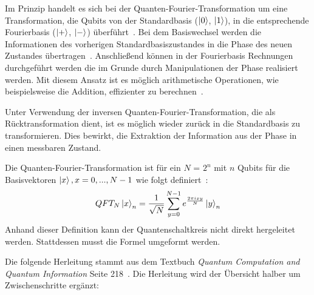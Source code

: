 Im Prinzip handelt es sich bei der Quanten-Fourier-Transformation um eine Transformation,
die Qubits von der Standardbasis (\(\ket{0}\), \(\ket{1}\)),
in die entsprechende Fourierbasis (\(\ket{+}\), \(\ket{-}\)) überführt~\cite{homeister2023quantum215}.
Bei dem Basiswechsel werden die Informationen des vorherigen Standardbasiszustandes in die Phase des neuen Zustandes übertragen~\cite{Ruiz-Perez2017}.
Anschließend können in der Fourierbasis Rechnungen durchgeführt werden die im Grunde durch Manipulationen der Phase realisiert werden.
Mit diesem Ansatz ist es möglich arithmetische Operationen, wie beispielsweise 
die Addition, effizienter zu berechnen~\cite{draper2000addition,Ruiz-Perez2017}.

Unter Verwendung der inversen Quanten-Fourier-Transformation, 
die als Rücktransformation dient, 
ist es möglich wieder zurück in die Standardbasis zu transformieren.
Dies bewirkt, die Extraktion der Information aus der Phase in einen messbaren Zustand. 

Die Quanten-Fourier-Transformation ist für ein \(N\) = \(2^n\) mit \(n\) Qubits
für die Basisvektoren \(\ket{x}, x = 0,...,N-1\) wie folgt definiert~\cite{Hoever2023QC}:
\[QFT_{N}\ket{x}_{n} = \frac{1}{\sqrt{N}}\sum_{y=0}^{N-1}  e^{\frac{2 \pi i x y}{N}}\ket{y}_{n}\]
Anhand dieser Definition kann der Quantenschaltkreis nicht direkt hergeleitet werden.
Stattdessen musst die Formel umgeformt werden.

Die folgende Herleitung stammt aus dem Textbuch \textit{Quantum Computation and Quantum Information} Seite 218~\cite{nielsen_chuang_2010}.
Die Herleitung wird der Übersicht halber um Zwischenschritte ergänzt:

